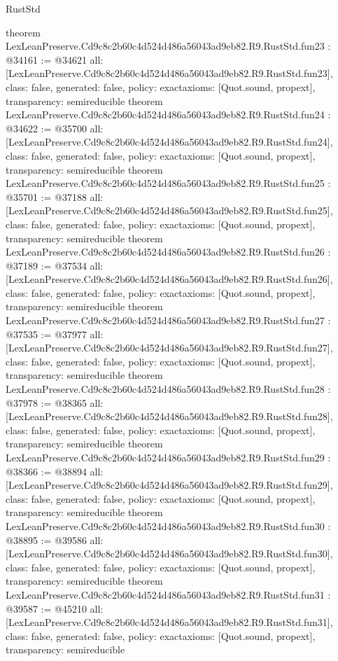 \begin{lexlean}{RustStd}
\begin{coremodule}
{}
theorem LexLeanPreserve.Cd9c8c2b60c4d524d486a56043ad9eb82.R9.RustStd.fun23 : @34161 := @34621 {
  all: [LexLeanPreserve.Cd9c8c2b60c4d524d486a56043ad9eb82.R9.RustStd.fun23],
  class: false,
  generated: false,
  policy: exact{axioms: [Quot.sound, propext]},
  transparency: semireducible
}
theorem LexLeanPreserve.Cd9c8c2b60c4d524d486a56043ad9eb82.R9.RustStd.fun24 : @34622 := @35700 {
  all: [LexLeanPreserve.Cd9c8c2b60c4d524d486a56043ad9eb82.R9.RustStd.fun24],
  class: false,
  generated: false,
  policy: exact{axioms: [Quot.sound, propext]},
  transparency: semireducible
}
theorem LexLeanPreserve.Cd9c8c2b60c4d524d486a56043ad9eb82.R9.RustStd.fun25 : @35701 := @37188 {
  all: [LexLeanPreserve.Cd9c8c2b60c4d524d486a56043ad9eb82.R9.RustStd.fun25],
  class: false,
  generated: false,
  policy: exact{axioms: [Quot.sound, propext]},
  transparency: semireducible
}
theorem LexLeanPreserve.Cd9c8c2b60c4d524d486a56043ad9eb82.R9.RustStd.fun26 : @37189 := @37534 {
  all: [LexLeanPreserve.Cd9c8c2b60c4d524d486a56043ad9eb82.R9.RustStd.fun26],
  class: false,
  generated: false,
  policy: exact{axioms: [Quot.sound, propext]},
  transparency: semireducible
}
theorem LexLeanPreserve.Cd9c8c2b60c4d524d486a56043ad9eb82.R9.RustStd.fun27 : @37535 := @37977 {
  all: [LexLeanPreserve.Cd9c8c2b60c4d524d486a56043ad9eb82.R9.RustStd.fun27],
  class: false,
  generated: false,
  policy: exact{axioms: [Quot.sound, propext]},
  transparency: semireducible
}
theorem LexLeanPreserve.Cd9c8c2b60c4d524d486a56043ad9eb82.R9.RustStd.fun28 : @37978 := @38365 {
  all: [LexLeanPreserve.Cd9c8c2b60c4d524d486a56043ad9eb82.R9.RustStd.fun28],
  class: false,
  generated: false,
  policy: exact{axioms: [Quot.sound, propext]},
  transparency: semireducible
}
theorem LexLeanPreserve.Cd9c8c2b60c4d524d486a56043ad9eb82.R9.RustStd.fun29 : @38366 := @38894 {
  all: [LexLeanPreserve.Cd9c8c2b60c4d524d486a56043ad9eb82.R9.RustStd.fun29],
  class: false,
  generated: false,
  policy: exact{axioms: [Quot.sound, propext]},
  transparency: semireducible
}
theorem LexLeanPreserve.Cd9c8c2b60c4d524d486a56043ad9eb82.R9.RustStd.fun30 : @38895 := @39586 {
  all: [LexLeanPreserve.Cd9c8c2b60c4d524d486a56043ad9eb82.R9.RustStd.fun30],
  class: false,
  generated: false,
  policy: exact{axioms: [Quot.sound, propext]},
  transparency: semireducible
}
theorem LexLeanPreserve.Cd9c8c2b60c4d524d486a56043ad9eb82.R9.RustStd.fun31 : @39587 := @45210 {
  all: [LexLeanPreserve.Cd9c8c2b60c4d524d486a56043ad9eb82.R9.RustStd.fun31],
  class: false,
  generated: false,
  policy: exact{axioms: [Quot.sound, propext]},
  transparency: semireducible
}
\end{coremodule}
\end{lexlean}
